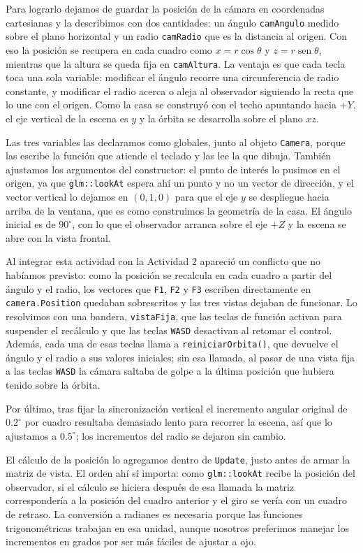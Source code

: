 Para lograrlo dejamos de guardar la posición de la cámara en coordenadas cartesianas y la describimos con dos cantidades: un ángulo \texttt{camAngulo} medido sobre el plano horizontal y un radio \texttt{camRadio} que es la distancia al origen. Con eso la posición se recupera en cada cuadro como $x = r\cos\theta$ y $z = r\operatorname{sen}\theta$, mientras que la altura se queda fija en \texttt{camAltura}. La ventaja es que cada tecla toca una sola variable: modificar el ángulo recorre una circunferencia de radio constante, y modificar el radio acerca o aleja al observador siguiendo la recta que lo une con el origen. Como la casa se construyó con el techo apuntando hacia $+Y$, el eje vertical de la escena es $y$ y la órbita se desarrolla sobre el plano $xz$.

Las tres variables las declaramos como globales, junto al objeto \texttt{Camera}, porque las escribe la función que atiende el teclado y las lee la que dibuja. También ajustamos los argumentos del constructor: el punto de interés lo pusimos en el origen, ya que \texttt{glm::lookAt} espera ahí un punto y no un vector de dirección, y el vector vertical lo dejamos en $(0,1,0)$ para que el eje $y$ se despliegue hacia arriba de la ventana, que es como construimos la geometría de la casa. El ángulo inicial es de $90^\circ$, con lo que el observador arranca sobre el eje $+Z$ y la escena se abre con la vista frontal.

Al integrar esta actividad con la Actividad 2 apareció un conflicto que no habíamos previsto: como la posición se recalcula en cada cuadro a partir del ángulo y el radio, los vectores que \texttt{F1}, \texttt{F2} y \texttt{F3} escriben directamente en \texttt{camera.Position} quedaban sobrescritos y las tres vistas dejaban de funcionar. Lo resolvimos con una bandera, \texttt{vistaFija}, que las teclas de función activan para suspender el recálculo y que las teclas \texttt{WASD} desactivan al retomar el control. Además, cada una de esas teclas llama a \texttt{reiniciarOrbita()}, que devuelve el ángulo y el radio a sus valores iniciales; sin esa llamada, al pasar de una vista fija a las teclas \texttt{WASD} la cámara saltaba de golpe a la última posición que hubiera tenido sobre la órbita.

Por último, tras fijar la sincronización vertical el incremento angular original de $0.2^\circ$ por cuadro resultaba demasiado lento para recorrer la escena, así que lo ajustamos a $0.5^\circ$; los incrementos del radio se dejaron sin cambio.

El cálculo de la posición lo agregamos dentro de \texttt{Update}, justo antes de armar la matriz de vista. El orden ahí sí importa: como \texttt{glm::lookAt} recibe la posición del observador, si el cálculo se hiciera después de esa llamada la matriz correspondería a la posición del cuadro anterior y el giro se vería con un cuadro de retraso. La conversión a radianes es necesaria porque las funciones trigonométricas trabajan en esa unidad, aunque nosotros preferimos manejar los incrementos en grados por ser más fáciles de ajustar a ojo.

